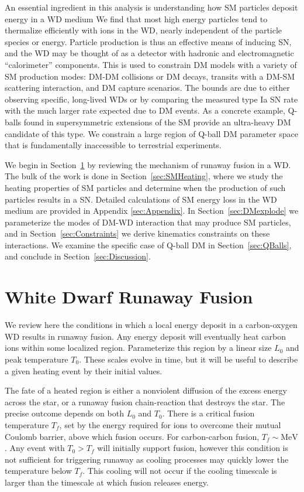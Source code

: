 \documentclass[twocolumn,preprintnumbers,amsmath,amssymb,prd, superscriptaddress]{revtex4} %
\newcommand{\MeV}{\text{MeV}}
\begin{document}
An essential ingredient in this analysis is understanding how SM particles deposit energy in a WD medium
We find that most high energy particles tend to thermalize efficiently with ions in the WD, nearly independent of the particle species or energy.
Particle production is thus an effective means of inducing SN, and the WD may be thought of as a detector with hadronic and electromagnetic ``calorimeter'' components.
This is used to constrain DM models with a variety of SM production modes: DM-DM collisions or DM decays, transits with a DM-SM scattering interaction, and DM capture scenarios.
The bounds are due to either observing specific, long-lived WDs or by comparing the measured type Ia SN rate with the much larger rate expected due to DM events.
As a concrete example, Q-balls found in supersymmetric extensions of the SM provide an ultra-heavy DM candidate of this type.
We constrain a large region of Q-ball DM parameter space that is fundamentally inaccessible to terrestrial experiments.

We begin in Section~\ref{sec:Review} by reviewing the mechanism of runaway fusion in a WD.
The bulk of the work is done in Section~\ref{sec:SMHeating}, where we study the heating properties of SM particles and determine when the production of such particles results in a SN.
Detailed calculations of SM energy loss in the WD medium are provided in Appendix \ref{sec:Appendix}.
In Section~\ref{sec:DMexplode} we parameterize the modes of DM-WD interaction that may produce SM particles, and in Section~\ref{sec:Constraints} we derive kinematics constraints on these interactions.
We examine the specific case of Q-ball DM in Section~\ref{sec:QBalls}, and conclude in Section~\ref{sec:Discussion}.

\section{White Dwarf Runaway Fusion}
\label{sec:Review}

We review here the conditions in which a local energy deposit in a carbon-oxygen WD results in runaway fusion.
Any energy deposit will eventually heat carbon ions within some localized region.
Parameterize this region by a linear size $L_0$ and peak temperature $T_0$.
These scales evolve in time, but it will be useful to describe a given heating event by their initial values.

The fate of a heated region is either a nonviolent diffusion of the excess energy across the star, or a runaway fusion chain-reaction that destroys the star.
The precise outcome depends on both $L_0$ and $T_0$.
There is a critical fusion temperature $T_f$, set by the energy required for ions to overcome their mutual Coulomb barrier, above which fusion occurs.
For carbon-carbon fusion, $T_f \sim \MeV$ \cite{Gasques:2005ar}.
Any event with $T_0 > T_f$ will initially support fusion, however this condition is not sufficient for triggering runaway as cooling processes may quickly lower the temperature below $T_f$.
This cooling will not occur if the cooling timescale is larger than the timescale at which fusion releases energy.
\end{document}
